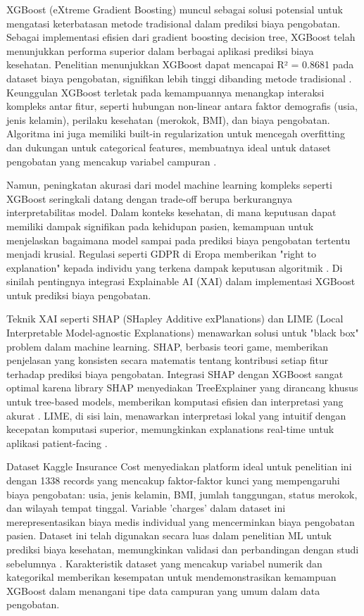 XGBoost (eXtreme Gradient Boosting) muncul sebagai solusi potensial untuk mengatasi keterbatasan metode tradisional dalam prediksi biaya pengobatan. Sebagai implementasi efisien dari gradient boosting decision tree, XGBoost telah menunjukkan performa superior dalam berbagai aplikasi prediksi biaya kesehatan. Penelitian menunjukkan XGBoost dapat mencapai R² = 0.8681 pada dataset biaya pengobatan, signifikan lebih tinggi dibanding metode tradisional \citep{Zhang2025}. Keunggulan XGBoost terletak pada kemampuannya menangkap interaksi kompleks antar fitur, seperti hubungan non-linear antara faktor demografis (usia, jenis kelamin), perilaku kesehatan (merokok, BMI), dan biaya pengobatan. Algoritma ini juga memiliki built-in regularization untuk mencegah overfitting dan dukungan untuk categorical features, membuatnya ideal untuk dataset pengobatan yang mencakup variabel campuran \citep{XGBoost2024}.

Namun, peningkatan akurasi dari model machine learning kompleks seperti XGBoost seringkali datang dengan trade-off berupa berkurangnya interpretabilitas model. Dalam konteks kesehatan, di mana keputusan dapat memiliki dampak signifikan pada kehidupan pasien, kemampuan untuk menjelaskan bagaimana model sampai pada prediksi biaya pengobatan tertentu menjadi krusial. Regulasi seperti GDPR di Eropa memberikan "right to explanation" kepada individu yang terkena dampak keputusan algoritmik \citep{Ahmed2025}. Di sinilah pentingnya integrasi Explainable AI (XAI) dalam implementasi XGBoost untuk prediksi biaya pengobatan.

Teknik XAI seperti SHAP (SHapley Additive exPlanations) dan LIME (Local Interpretable Model-agnostic Explanations) menawarkan solusi untuk "black box" problem dalam machine learning. SHAP, berbasis teori game, memberikan penjelasan yang konsisten secara matematis tentang kontribusi setiap fitur terhadap prediksi biaya pengobatan. Integrasi SHAP dengan XGBoost sangat optimal karena library SHAP menyediakan TreeExplainer yang dirancang khusus untuk tree-based models, memberikan komputasi efisien dan interpretasi yang akurat \citep{Lundberg2017}. LIME, di sisi lain, menawarkan interpretasi lokal yang intuitif dengan kecepatan komputasi superior, memungkinkan explanations real-time untuk aplikasi patient-facing \citep{tenHeuvel2023}.

Dataset Kaggle Insurance Cost menyediakan platform ideal untuk penelitian ini dengan 1338 records yang mencakup faktor-faktor kunci yang mempengaruhi biaya pengobatan: usia, jenis kelamin, BMI, jumlah tanggungan, status merokok, dan wilayah tempat tinggal. Variable 'charges' dalam dataset ini merepresentasikan biaya medis individual yang mencerminkan biaya pengobatan pasien. Dataset ini telah digunakan secara luas dalam penelitian ML untuk prediksi biaya kesehatan, memungkinkan validasi dan perbandingan dengan studi sebelumnya \citep{Orji2023}. Karakteristik dataset yang mencakup variabel numerik dan kategorikal memberikan kesempatan untuk mendemonstrasikan kemampuan XGBoost dalam menangani tipe data campuran yang umum dalam data pengobatan.

